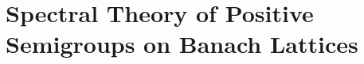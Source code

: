 \setcounter{chapter}{2}
\chapter{Spectral Theory of Positive Semigroups on Banach Lattices}\label{chap:c3}
